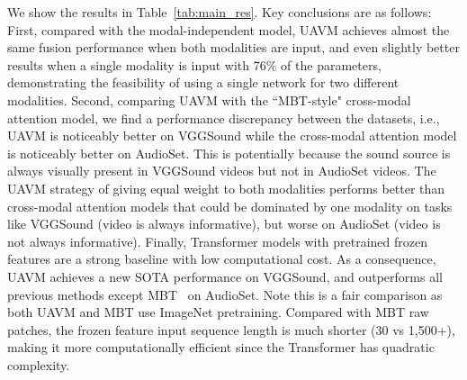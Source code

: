 \documentclass[journal]{IEEEtran}
\newcommand{\rev}[1]{{\color{dblue} #1}}
\begin{document}
We show the results in Table~\ref{tab:main_res}. Key conclusions are as follows: First, compared with the modal-independent model, UAVM achieves almost the same fusion performance when both modalities are input, and even slightly better results when a single modality is input \rev{with 76\% of the parameters}, demonstrating the feasibility of using a single network for two different modalities. Second, comparing UAVM with the ``MBT-style" cross-modal attention model, we find a performance discrepancy between the datasets, i.e., UAVM is noticeably better on VGGSound while the cross-modal attention model is noticeably better on AudioSet. This is potentially because the sound source is always visually present in VGGSound videos but not in AudioSet videos. The UAVM strategy of giving equal weight to both modalities performs better than cross-modal attention models that could be dominated by one modality on tasks like VGGSound (video is always informative), but worse on AudioSet (video is not always informative). Finally, Transformer models with pretrained frozen features are a strong baseline with low computational cost. As a consequence, UAVM achieves a new SOTA performance on VGGSound, and outperforms all previous methods except MBT~\cite{nagrani2021attention} on AudioSet. \rev{Note this is a fair comparison as both UAVM and MBT use ImageNet pretraining}. \rev{Compared with MBT raw patches, the frozen feature input sequence length} is much shorter (30 vs 1,500+), making it more computationally efficient since the Transformer has quadratic complexity.
\end{document}

